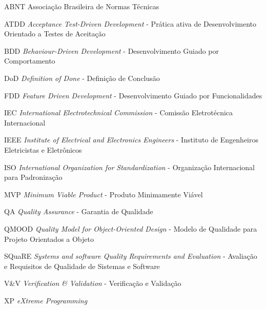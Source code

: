 \documentclass[
	12pt,				%
	openright,			%
	oneside,			%
	a4paper,			%
	english,			%
	brazil,				%
	]{abntex2}
\begin{document}
\begin{siglas}
    \item[ABNT] Associação Brasileira de Normas Técnicas
    \item[ATDD] \emph{Acceptance Test-Driven Development} - Prática ativa de Desenvolvimento Orientado a Testes de Aceitação
    \item[BDD] \emph{Behaviour-Driven Development} - Desenvolvimento Guiado por Comportamento
    \item[DoD] \emph{Definition of Done} - Definição de Conclusão
    \item[FDD] \emph{Feature Driven Development} - Desenvolvimento Guiado por Funcionalidades
    \item[IEC] \emph{International Electrotechnical Commission} - Comissão Eletrotécnica Internacional
    \item[IEEE] \emph{Institute of Electrical and Electronics Engineers} - Instituto de Engenheiros Eletricistas e Eletrônicos
    \item[ISO] \emph{International Organization for Standardization} - Organização Internacional para Padronização
    \item[MVP] \emph{Minimum Viable Product} - Produto Minimamente Viável
    \item[QA] \emph{Quality Assurance} - Garantia de Qualidade
    \item[QMOOD] \emph{Quality Model for Object-Oriented Design} - Modelo de Qualidade
para Projeto Orientados a Objeto
    \item[SQuaRE] \emph{Systems and software Quality Requirements and Evaluation} - Avaliação e Requisitos de Qualidade de Sistemas e Software
    \item[V\&V] \emph{Verification \& Validation} - Verificação e Validação
    \item[XP] \emph{eXtreme Programming}
\end{siglas}

\end{document}
